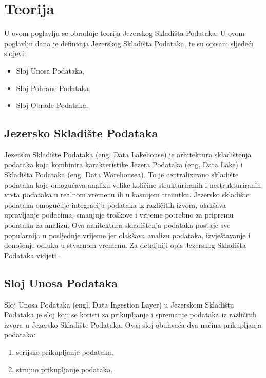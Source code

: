 \chapter{Teorija} \label{chapter:teorija}
U ovom poglavlju se obrađuje teorija Jezerskog Skladišta Podataka. U ovom
poglavlju dana je definicija Jezerskog Skladišta Podataka, te su opisani
sljedeći slojevi:
\begin{itemize}
    \item Sloj Unosa Podataka,
    \item Sloj Pohrane Podataka,
    \item Sloj Obrade Podataka.
\end{itemize}

\section{Jezersko Skladište Podataka} \label{section:jezersko_skladiste_podataka}
Jezersko Skladište Podataka (eng. Data Lakehouse) je arhitektura skladištenja
podataka koja kombinira karakteristike Jezera Podataka (eng. Data Lake) i
Skladišta Podataka (eng. Data Warehousea). To je centralizirano skladište
podataka koje omogućava analizu velike količine strukturiranih i
nestrukturiranih vrsta podataka u realnom vremenu ili u kasnijem trenutku.
Jezersko skladište podataka omogućuje integraciju podataka iz različitih izvora,
olakšava upravljanje podacima, smanjuje troškove i vrijeme potrebno za pripremu
podataka za analizu. Ova arhitektura skladištenja podataka postaje sve
popularnija u posljednje vrijeme jer olakšava analizu podataka, izvještavanje i
donošenje odluka u stvarnom vremenu. Za detaljniji opis Jezerskog Skladišta
Podataka vidjeti \cite[c.2]{datalakehouse2022}.

\section{Sloj Unosa Podataka} \label{section:sloj_unosa_podataka}
Sloj Unosa Podataka (engl. Data Ingestion Layer) u Jezerskom Skladištu Podataka
je sloj koji se koristi za prikupljanje i spremanje podataka iz različitih
izvora u Jezersko Skladište Podataka. Ovaj sloj obuhvaća dva načina prikupljanja
podataka:
\begin{enumerate}
    \item serijsko prikupljanje podataka,
    \item strujno prikupljanje podataka.
\end{enumerate}

